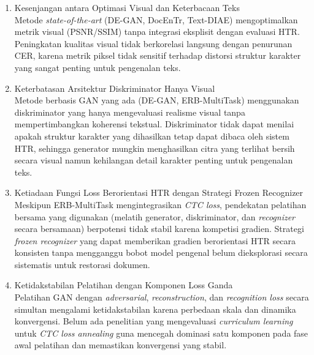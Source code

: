 \begin{enumerate}[label=\arabic*., leftmargin=0.5cm]
    \item Kesenjangan antara Optimasi Visual dan Keterbacaan Teks \\
    Metode \textit{state-of-the-art} (DE-GAN, DocEnTr, Text-DIAE) mengoptimalkan metrik visual (PSNR/SSIM) tanpa integrasi eksplisit dengan evaluasi HTR. Peningkatan kualitas visual tidak berkorelasi langsung dengan penurunan CER, karena metrik piksel tidak sensitif terhadap distorsi struktur karakter yang sangat penting untuk pengenalan teks.

    \item Keterbatasan Arsitektur Diskriminator Hanya Visual \\
    Metode berbasis GAN yang ada (DE-GAN, ERB-MultiTask) menggunakan diskriminator yang hanya mengevaluasi realisme visual tanpa mempertimbangkan koherensi tekstual. Diskriminator tidak dapat menilai apakah struktur karakter yang dihasilkan tetap dapat dibaca oleh sistem HTR, sehingga generator mungkin menghasilkan citra yang terlihat bersih secara visual namun kehilangan detail karakter penting untuk pengenalan teks.

    \item Ketiadaan Fungsi Loss Berorientasi HTR dengan Strategi Frozen Recognizer \\
    Meskipun ERB-MultiTask mengintegrasikan \textit{CTC loss}, pendekatan pelatihan bersama yang digunakan (melatih generator, diskriminator, dan \textit{recognizer} secara bersamaan) berpotensi tidak stabil karena kompetisi gradien. Strategi \textit{frozen recognizer} yang dapat memberikan gradien berorientasi HTR secara konsisten tanpa mengganggu bobot model pengenal belum dieksplorasi secara sistematis untuk restorasi dokumen.

    \item Ketidakstabilan Pelatihan dengan Komponen Loss Ganda \\
    Pelatihan GAN dengan \textit{adversarial}, \textit{reconstruction}, dan \textit{recognition loss} secara simultan mengalami ketidakstabilan karena perbedaan skala dan dinamika konvergensi. Belum ada penelitian yang mengevaluasi \textit{curriculum learning} untuk \textit{CTC loss annealing} guna mencegah dominasi satu komponen pada fase awal pelatihan dan memastikan konvergensi yang stabil.

\end{enumerate}

